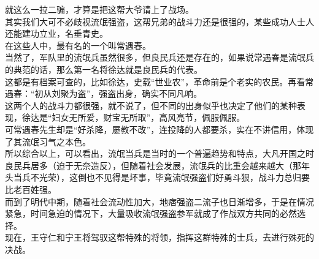 \begin{multicols}{\theparacolNo}
就这么一拉二骗，才算是把这帮大爷请上了战场。\\

其实我们大可不必歧视流氓强盗，这帮兄弟的战斗力还是很强的，某些成功人士人还能建功立业，名垂青史。\\

在这些人中，最有名的一个叫常遇春。\\

当然了，军队里的流氓兵虽然很多，但良民兵还是存在的，如果说常遇春是流氓兵的典范的话，那么第一名将徐达就是良民兵的代表。\\

这都是有档案可查的，比如徐达，史载“世业农”，革命前是个老实的农民。再看常遇春：“初从刘聚为盗”，强盗出身，确实不同凡响。\\

这两个人的战斗力都很强，就不说了，但不同的出身似乎也决定了他们的某种表现，徐达是“妇女无所爱，财宝无所取”，高风亮节，佩服佩服。\\

可常遇春先生却是“好杀降，屡教不改”，连投降的人都要杀，实在不讲信用，体现了其流氓习气之本色。\\

所以综合以上，可以看出，流氓当兵是当时的一个普遍趋势和特点，大凡开国之时良民兵居多（迫于无奈造反），但随着社会发展，流氓兵的比重会越来越大（那年头当兵不光荣），这倒也不见得是坏事，毕竟流氓强盗们好勇斗狠，战斗力总归要比老百姓强。\\

而到了明代中期，随着社会流动性加大，地痞强盗二流子也日渐增多，于是在情况紧急，时间急迫的情况下，大量吸收流氓强盗参军就成了作战双方共同的必然选择。\\

现在，王守仁和宁王将驾驭这帮特殊的将领，指挥这群特殊的士兵，去进行殊死的决战。\\
\ifnum{}
	\end{multicols}
\fi
\newpage
